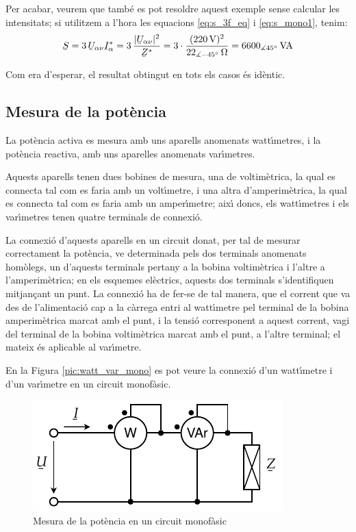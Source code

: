 \begin{exemple}
    Per acabar, veurem que tamb\'{e} es pot resoldre aquest exemple
    sense calcular les intensitats; si utilitzem a l'hora les
    equacions \eqref{eq:s_3f_eq} i \eqref{eq:s_mono1}, tenim:
    \[
    \cmplx{S} = 3\,\cmplx{U}_{\alpha\nu} \cmplx{I}_\alpha^* = 3\,
    \frac{|\cmplx{U}_{\alpha\nu}|^2}{\cmplx{Z}^*} =
    3\cdot\frac{(220\unit{V})^2}{22_{\measuredangle
    -45\degree}\unit{\ohm}} = 6600_{\measuredangle 45\degree}\unit{VA}
    \]

    Com era d'esperar, el resultat obtingut en tots els casos
    \'{e}s id\`{e}ntic.
\end{exemple}

\subsection{Mesura de la pot\`{e}ncia}

La pot\`{e}ncia activa es mesura amb uns aparells anomenats watt\'{\i}metres,
i la pot\`{e}ncia reactiva, amb uns aparelles anomenats var\'{\i}metres.

Aquests aparells tenen dues bobines de mesura, una de voltim\`{e}trica,
la qual es connecta tal com es faria amb un volt\'{\i}metre, i una altra
d'amperim\`{e}trica, la qual es connecta tal com es faria amb un
amper\'{\i}metre; aix\'{\i} doncs, els watt\'{\i}metres i els var\'{\i}metres tenen
quatre terminals de connexi\'{o}.

La connexi\'{o} d'aquests aparells en un circuit donat, per tal de
mesurar correctament la pot\`{e}ncia, ve determinada pels dos terminals
anomenats hom\`{o}legs, un d'aquests terminals pertany a la bobina
voltim\`{e}trica i l'altre a l'amperim\`{e}trica; en els esquemes el\`{e}ctrics,
aquests dos terminals s'identifiquen mitjan\c{c}ant un punt. La connexi\'{o}
ha de fer-se de tal manera, que el corrent que va des de
l'alimentaci\'{o} cap a la c\`{a}rrega entri al watt\'{\i}metre pel terminal de
la bobina amperim\`{e}trica marcat amb el punt, i la tensi\'{o} corresponent
a aquest corrent, vagi del terminal de la bobina voltim\`{e}trica marcat
amb el punt, a l'altre terminal; el mateix \'{e}s aplicable al
var\'{\i}metre.

En la Figura \vref{pic:watt_var_mono} es pot veure la connexi\'{o} d'un
watt\'{\i}metre i d'un var\'{\i}metre en un circuit monof\`{a}sic.


\begin{figure}[h]
\centering
    \includegraphics{Imatges/Cap-Fonaments-Mesura-Potencia-Monof.pdf}
\caption{Mesura de la pot\`{e}ncia en un circuit  monof\`{a}sic}
\label{pic:watt_var_mono}
\end{figure}

